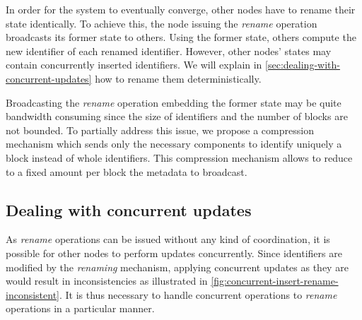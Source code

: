 \documentclass[sigplan,10pt]{acmart}
\begin{document}
In order for the system to eventually converge, other nodes have to rename their state identically.
To achieve this, the node issuing the \emph{rename} operation broadcasts its former state to others.
Using the former state, others compute the new identifier of each renamed identifier.
However, other nodes' states may contain concurrently inserted identifiers.
We will explain in \autoref{sec:dealing-with-concurrent-updates} how to rename them deterministically.

Broadcasting the \emph{rename} operation embedding the former state may be quite bandwidth consuming since the size of identifiers and the number of blocks are not bounded.
To partially address this issue, we propose a compression mechanism which sends only the necessary components to identify uniquely a block instead of whole identifiers.
This compression mechanism allows to reduce to a fixed amount per block the metadata to broadcast.

\subsection{Dealing with concurrent updates}

\label{sec:dealing-with-concurrent-updates}

As \emph{rename} operations can be issued without any kind of coordination, it is possible for other nodes to perform updates concurrently.
Since identifiers are modified by the \emph{renaming} mechanism, applying concurrent updates as they are would result in inconsistencies as illustrated in \autoref{fig:concurrent-insert-rename-inconsistent}.
It is thus necessary to handle concurrent operations to \emph{rename} operations in a particular manner.
\end{document}
